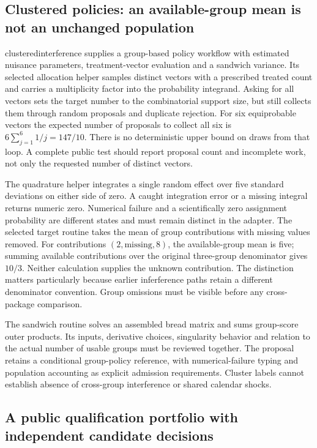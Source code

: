 \subsection{Clustered policies: an available-group mean is not an unchanged population}

clusteredinterference supplies a group-based policy workflow with estimated nuisance parameters, treatment-vector evaluation and a sandwich variance. Its selected allocation helper samples distinct vectors with a prescribed treated count and carries a multiplicity factor into the probability integrand. Asking for all vectors sets the target number to the combinatorial support size, but still collects them through random proposals and duplicate rejection. For six equiprobable vectors the expected number of proposals to collect all six is $6\sum_{j=1}^6 1/j=147/10$. There is no deterministic upper bound on draws from that loop. A complete public test should report proposal count and incomplete work, not only the requested number of distinct vectors.\citep{exec25_rnet_cluster,exec25_rnet_choice}

The quadrature helper integrates a single random effect over five standard deviations on either side of zero. A caught integration error or a missing integral returns numeric zero. Numerical failure and a scientifically zero assignment probability are different states and must remain distinct in the adapter. The selected target routine takes the mean of group contributions with missing values removed. For contributions $(2,\text{missing},8)$, the available-group mean is five; summing available contributions over the original three-group denominator gives $10/3$. Neither calculation supplies the unknown contribution. The distinction matters particularly because earlier inferference paths retain a different denominator convention. Group omissions must be visible before any cross-package comparison.\citep{exec25_rnet_cluster,exec24_interference_inferference,exec25_rnet_choice}

The sandwich routine solves an assembled bread matrix and sums group-score outer products. Its inputs, derivative choices, singularity behavior and relation to the actual number of usable groups must be reviewed together. The proposal retains a conditional group-policy reference, with numerical-failure typing and population accounting as explicit admission requirements. Cluster labels cannot establish absence of cross-group interference or shared calendar shocks.\citep{exec25_rnet_cluster}

\subsection{A public qualification portfolio with independent candidate decisions}

